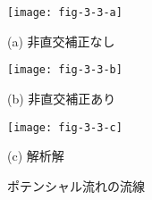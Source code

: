 \begin{figure}[p]
 \texttt{[image: fig-3-3-a]}\par
 \medskip
 (a) 非直交補正なし\par
 \bigskip
 \texttt{[image: fig-3-3-b]}\par
 \medskip
 (b) 非直交補正あり\par
 \bigskip
 \texttt{[image: fig-3-3-c]}\par
 \medskip
 (c) 解析解\par
 \medskip
 \caption{ポテンシャル流れの流線}
 \label{fig:3.3}
\end{figure}






